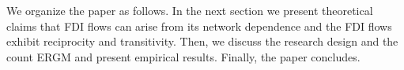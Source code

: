 \documentclass[reqno,onecolumn,letterpaper,12pt]{article}
\begin{document}
We organize the paper as follows. In the next section %
we present theoretical claims that FDI flows can arise from its network dependence and the FDI flows exhibit reciprocity and transitivity. Then, we discuss the research design and the count ERGM and present empirical results. Finally, the paper concludes.








\end{document}
